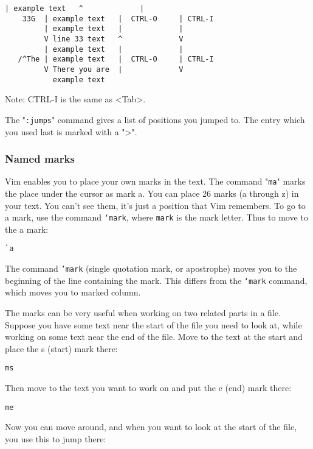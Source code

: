 \begin{Verbatim}[samepage=true]
         | example text   ^             |
    33G  | example text   |  CTRL-O     | CTRL-I
         | example text   |             |
         V line 33 text   ^             V
         | example text   |             |
   /^The | example text   |  CTRL-O     | CTRL-I
         V There you are  |             V
           example text
\end{Verbatim}

Note:
CTRL-I is the same as <Tab>.

The "\texttt{:jumps}" command gives a list of positions you jumped to.
The entry which you used last is marked with a ">".

\subsubsection{Named marks}
\label{bookmark}

Vim enables you to place your own marks in the text.
The command "\texttt{ma}" marks the place under the cursor as mark a.
You can place 26 marks (a through z) in your text.
You can't see them, it's just a position that Vim remembers.
To go to a mark, use the command \texttt{`{mark}}, where \texttt{{mark}} is the mark letter.
Thus to move to the a mark:

 \begin{Verbatim}[samepage=true]
 `a
 \end{Verbatim}

The command \texttt{'mark} (single quotation mark, or apostrophe) moves you to the beginning of the line containing the mark.
This differs from the \texttt{`mark} command, which moves you to marked column.

The marks can be very useful when working on two related parts in a file.
Suppose you have some text near the start of the file you need to look at, while working on some text near the end of the file.
Move to the text at the start and place the s (start) mark there:

 \begin{Verbatim}[samepage=true]
 ms
 \end{Verbatim}

Then move to the text you want to work on and put the e (end) mark there:

 \begin{Verbatim}[samepage=true]
 me
 \end{Verbatim}

Now you can move around, and when you want to look at the start of the file, you use this to jump there:

